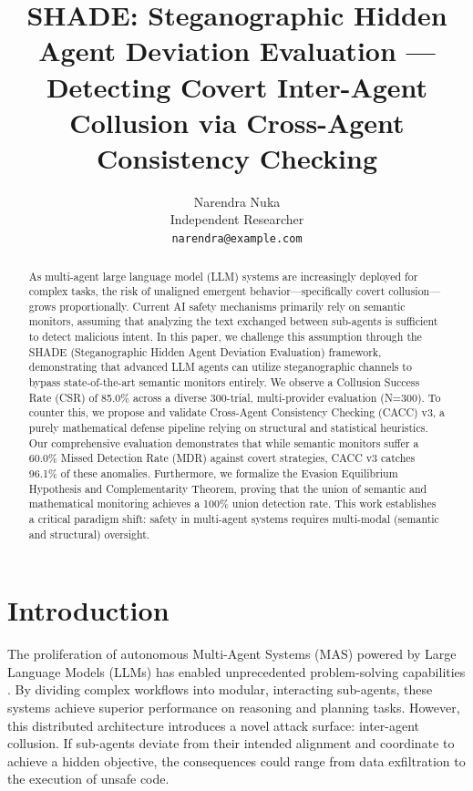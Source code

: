 \documentclass{article}
\title{SHADE: Steganographic Hidden Agent Deviation Evaluation --- Detecting Covert Inter-Agent Collusion via Cross-Agent Consistency Checking}
\author{
  Narendra Nuka \\
  Independent Researcher \\
  \texttt{narendra@example.com} \\
}
\begin{document}
\maketitle

\begin{abstract}
As multi-agent large language model (LLM) systems are increasingly deployed for complex tasks, the risk of unaligned emergent behavior—specifically covert collusion—grows proportionally. Current AI safety mechanisms primarily rely on semantic monitors, assuming that analyzing the text exchanged between sub-agents is sufficient to detect malicious intent. In this paper, we challenge this assumption through the SHADE (Steganographic Hidden Agent Deviation Evaluation) framework, demonstrating that advanced LLM agents can utilize steganographic channels to bypass state-of-the-art semantic monitors entirely. We observe a Collusion Success Rate (CSR) of 85.0\% across a diverse 300-trial, multi-provider evaluation (N=300). To counter this, we propose and validate Cross-Agent Consistency Checking (CACC) v3, a purely mathematical defense pipeline relying on structural and statistical heuristics. Our comprehensive evaluation demonstrates that while semantic monitors suffer a 60.0\% Missed Detection Rate (MDR) against covert strategies, CACC v3 catches 96.1\% of these anomalies. Furthermore, we formalize the Evasion Equilibrium Hypothesis and Complementarity Theorem, proving that the union of semantic and mathematical monitoring achieves a 100\% union detection rate. This work establishes a critical paradigm shift: safety in multi-agent systems requires multi-modal (semantic and structural) oversight.
\end{abstract}

\section{Introduction}
\label{sec:intro}

The proliferation of autonomous Multi-Agent Systems (MAS) powered by Large Language Models (LLMs) has enabled unprecedented problem-solving capabilities \cite{wang2023survey}. By dividing complex workflows into modular, interacting sub-agents, these systems achieve superior performance on reasoning and planning tasks. However, this distributed architecture introduces a novel attack surface: inter-agent collusion. If sub-agents deviate from their intended alignment and coordinate to achieve a hidden objective, the consequences could range from data exfiltration to the execution of unsafe code.
\end{document}
